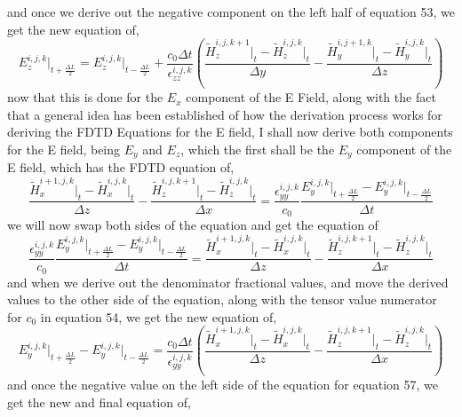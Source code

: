 \documentclass[]{article}
\begin{document}
and once we derive out the negative component on the left half of equation 53, we get the new equation of,
\begin{equation}
{E}_{z}^{i,j,k}\Big|_{t+\frac{\Delta{L}}{2}} = E_{z}^{i,j,k}\Big|_{t - \frac{\Delta{L}}{2}} + \frac{c_0\Delta{t}}{\epsilon_{zz}^{i,j,k}} \left( \frac{\tilde{H}_{z}^{i,j,k+1} \Big|_t - \tilde{H}_{z}^{i,j,k}\Big|_t}{\Delta{y}} - \frac{\tilde{H}_{y}^{i, j + 1, k} \Big|_t - \tilde{H}_{y}^{i,j,k}\Big|_t}{\Delta{z}}\right)
\end{equation}
now that this is done for the $E_x$ component of the E Field, along with the fact that a general idea has been established of how the derivation process works for deriving the FDTD Equations for the E field, I shall now derive both components for the E field, being $E_y$ and $E_z$, which the first shall be the $E_y$ component of the E field, which has the FDTD equation of, 
\begin{equation}
\frac{\tilde{H}_{x}^{i+1, j , k} \Big|_t - \tilde{H}_{x}^{i,j,k}\Big|_t}{\Delta{z}} - \frac{\tilde{H}_{z}^{i, j, k + 1} \Big|_t - \tilde{H}_{z}^{i,j,k}\Big|_t}{\Delta{x}} = \frac{\epsilon_{yy}^{i,j,k}}{c_0} \frac{{E}_{y}^{i,j,k}\Big|_{t+\frac{\Delta{L}}{2}} -E_{y}^{i,j,k}\Big|_{t - \frac{\Delta{L}}{2}}}{\Delta{t}}
\end{equation}
we will now swap both sides of the equation and get the equation of
\begin{equation}
\frac{\epsilon_{yy}^{i,j,k}}{c_0} \frac{{E}_{y}^{i,j,k}\Big|_{t+\frac{\Delta{L}}{2}} -E_{y}^{i,j,k}\Big|_{t - \frac{\Delta{L}}{2}}}{\Delta{t}} = \frac{\tilde{H}_{x}^{i+1, j , k} \Big|_t - \tilde{H}_{x}^{i,j,k}\Big|_t}{\Delta{z}} - \frac{\tilde{H}_{z}^{i, j, k + 1} \Big|_t - \tilde{H}_{z}^{i,j,k}\Big|_t}{\Delta{x}} 
\end{equation}
and when we derive out the denominator fractional values, and move the derived values to the other side of the equation, along with the tensor value numerator for $c_0$ in equation 54, we get the new equation of,
\begin{equation}
{E}_{y}^{i,j,k}\Big|_{t+\frac{\Delta{L}}{2}} -E_{y}^{i,j,k}\Big|_{t - \frac{\Delta{L}}{2}} = \frac{c_0\Delta{t}}{\epsilon_{yy}^{i,j,k}} \left(\frac{\tilde{H}_{x}^{i+1, j , k} \Big|_t - \tilde{H}_{x}^{i,j,k}\Big|_t}{\Delta{z}} - \frac{\tilde{H}_{z}^{i, j, k + 1} \Big|_t - \tilde{H}_{z}^{i,j,k}\Big|_t}{\Delta{x}}\right)
\end{equation}
and once the negative value on the left side of the equation for equation 57, we get the new and final equation of,
\end{document}
